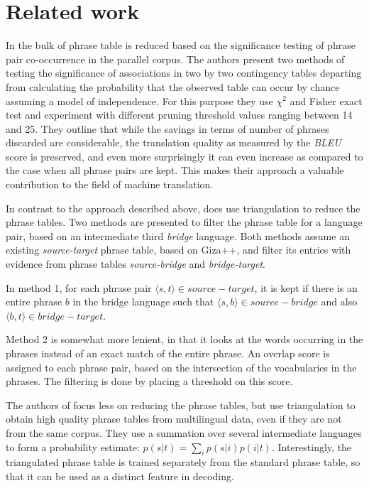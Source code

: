 \documentclass[11pt]{article}
\begin{document}
\section{Related work}

In \cite{Johnson} the bulk of phrase table is reduced based on the significance testing of phrase pair co-occurrence in the parallel corpus. The authors present two methods of testing the significance of associations in two by two contingency tables departing from calculating the probability that the observed table can occur by chance assuming a model of independence. For this purpose they use $\chi^2$ and Fisher exact test and experiment with different pruning threshold values ranging between 14 and 25. They outline that while the savings in terms of number of phrases discarded are considerable, the translation quality as measured by the \textit{BLEU} score is preserved, and even more surprisingly it can even increase as compared to the case when all phrase pairs are kept. This makes their approach a valuable contribution to the field of machine translation.


In contrast to the approach described above, \cite{chen} does use triangulation to reduce the phrase tables.
Two methods are presented to filter the phrase table for a language pair, based on an intermediate third \emph{bridge} language. Both methods assume an existing {\em source-target} phrase table, based on Giza++, and filter its entries with evidence from phrase tables {\em source-bridge} and {\em bridge-target}.

In method 1, for each phrase pair $\langle s, t\rangle \in source-target$, it is kept if there is an entire phrase $b$ in the bridge language such that $\langle s,b\rangle \in source-bridge$ and also $\langle b,t\rangle \in bridge-target$.

Method 2 is somewhat more lenient, in that it looks at the words occurring in the phrases instead of an exact match of the entire phrase. An overlap score is assigned to each phrase pair, based on the intersection of the vocabularies in the phrases. The filtering is done by placing a threshold on this score.

The authors of \cite{cohn} focus less on reducing the phrase tables, but use triangulation to obtain high quality phrase tables from multilingual data, even if they are not from the same corpus. They use a summation over several intermediate languages to form a probability estimate: $p(s|t)=\sum_i p(s|i)p(i|t)$. Interestingly, the triangulated phrase table is trained separately from the standard phrase table, so that it can be used as a distinct feature in decoding.
\end{document}
